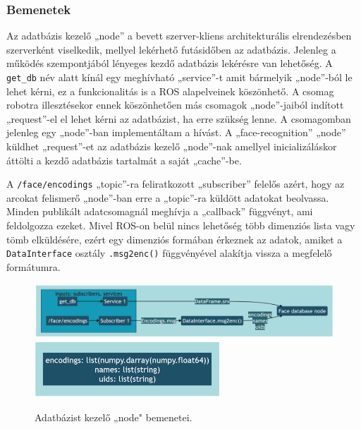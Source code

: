 \subsubsection{Bemenetek}
Az adatbázis kezelő „node” a bevett szerver-kliens architekturális elrendezésben szerverként viselkedik, mellyel lekérhető futásidőben az adatbázis. Jelenleg a működés szempontjából lényeges kezdő adatbázis lekérésre van lehetőség. A \verb|get_db| név alatt kínál egy meghívható „service”-t amit bármelyik „node”-ból le lehet kérni, ez a funkcionalitás is a ROS alapelveinek köszönhető. A csomag robotra illesztésekor ennek köszönhetően más csomagok „node”-jaiból indított „request”-el el lehet kérni az adatbázist, ha erre szükség lenne. A csomagomban jelenleg egy „node”-ban implementáltam a hívást. A „face-recognition” „node” küldhet „request”-et az adatbázis kezelő „node”-nak amellyel inicializáláskor áttölti a kezdő adatbázis tartalmát a saját „cache”-be.

A \verb|/face/encodings| „topic”-ra feliratkozott „subscriber” felelős azért, hogy az arcokat felismerő „node”-ban erre a „topic”-ra küldött adatokat beolvassa. Minden publikált adatcsomagnál meghívja a „callback” függvényt, ami feldolgozza ezeket. Mivel ROS-on belül nincs lehetőség több dimenziós lista vagy tömb elküldésére, ezért egy dimenziós formában érkeznek az adatok, amiket a \verb|DataInterface| osztály \verb|.msg2enc()| függvényével alakítja vissza a megfelelő formátumra.

\begin{figure}[!ht]
    \centering
    \includegraphics[width=150mm, keepaspectratio]{02_mermaid/db_bemenet1.png}
    \includegraphics[width=70mm, keepaspectratio]{02_mermaid/db_bemenet2.png}
    \caption{Adatbázist kezelő „node" bemenetei.}
    \label{fig:bdi}
\end{figure}

